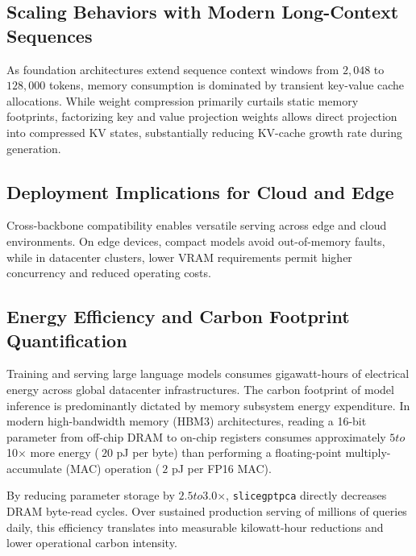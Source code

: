 \subsection{Scaling Behaviors with Modern Long-Context Sequences}
As foundation architectures extend sequence context windows from $2{,}048$ to $128{,}000$ tokens, memory consumption is dominated by transient key-value cache allocations. While weight compression primarily curtails static memory footprints, factorizing key and value projection weights allows direct projection into compressed KV states, substantially reducing KV-cache growth rate during generation.

\subsection{Deployment Implications for Cloud and Edge}
Cross-backbone compatibility enables versatile serving across edge and cloud environments. On edge devices, compact models avoid out-of-memory faults, while in datacenter clusters, lower VRAM requirements permit higher concurrency and reduced operating costs.

\subsection{Energy Efficiency and Carbon Footprint Quantification}
Training and serving large language models consumes gigawatt-hours of electrical energy across global datacenter infrastructures. The carbon footprint of model inference is predominantly dictated by memory subsystem energy expenditure. In modern high-bandwidth memory (HBM3) architectures, reading a 16-bit parameter from off-chip DRAM to on-chip registers consumes approximately $5$\times$ to $10$\times$ more energy ($~20$ pJ per byte) than performing a floating-point multiply-accumulate (MAC) operation ($~2$ pJ per FP16 MAC).

By reducing parameter storage by $2.5$\times$ to $3.0$\times$, \texttt{slicegptpca} directly decreases DRAM byte-read cycles. Over sustained production serving of millions of queries daily, this efficiency translates into measurable kilowatt-hour reductions and lower operational carbon intensity.
